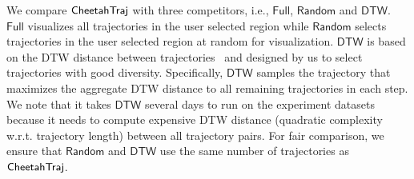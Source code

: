  We compare $\mathsf{CheetahTraj}$ with three competitors, i.e., $\mathsf{Full}$, $\mathsf{Random}$ and $\mathsf{DTW}$. $\mathsf{Full}$ visualizes all trajectories in the user selected region while $\mathsf{Random}$ selects trajectories in the user selected region at random for visualization. $\mathsf{DTW}$ is based on the DTW distance between trajectories~\cite{borcan2012improving} and designed by us to select trajectories with good diversity. Specifically, $\mathsf{DTW}$ samples the trajectory that maximizes the aggregate DTW distance to all remaining trajectories in each step. We note that it takes $\mathsf{DTW}$ several days to run on the experiment datasets because it needs to compute expensive DTW distance (quadratic complexity w.r.t. trajectory length) between all trajectory pairs. For fair comparison, we ensure that $\mathsf{Random}$ and $\mathsf{DTW}$ use the same number of trajectories as $\mathsf{CheetahTraj}$.







